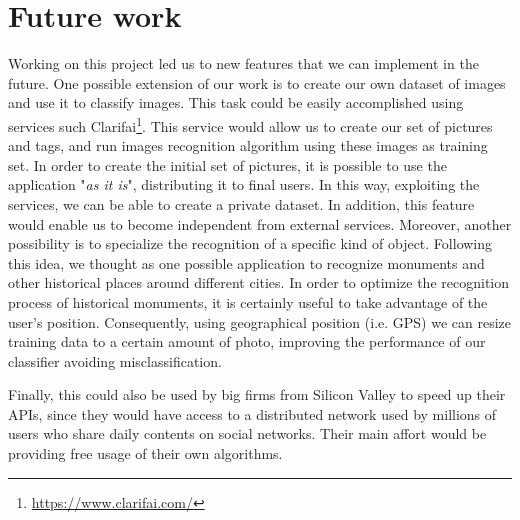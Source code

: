 \section{Future work}
\label{sec:future}

Working on this project led us to new features that we can implement in the 
future.
One possible extension of our work is to create our own dataset of images and 
use it to classify images. This task could be easily accomplished using 
services such Clarifai\footnote{\url{https://www.clarifai.com/}}. This service 
would allow us to create our set of pictures and tags, and run images 
recognition algorithm using these images as training set. In order to create the 
initial set of pictures, it is possible to use the application "\textit{as it 
is}", distributing it to final users. In this way, exploiting the services, we 
can be able to create a private dataset. In addition, this feature would enable 
us to become independent from external services.
Moreover, another possibility is to specialize the recognition of a specific 
kind of object. Following this idea, we thought as one possible application to 
recognize monuments and other historical places around different cities. In 
order to optimize the recognition process of historical monuments, it is 
certainly useful to take advantage of the user's position. Consequently, using 
geographical position (i.e. GPS) we can resize training data to a certain amount 
of photo, improving the performance of our classifier avoiding 
misclassification.

Finally, this could also be used by big firms from Silicon Valley to speed up 
their APIs, since they would have access to a distributed network used by 
millions of users who share daily contents on social networks. Their main affort 
would be providing free usage of their own algorithms.